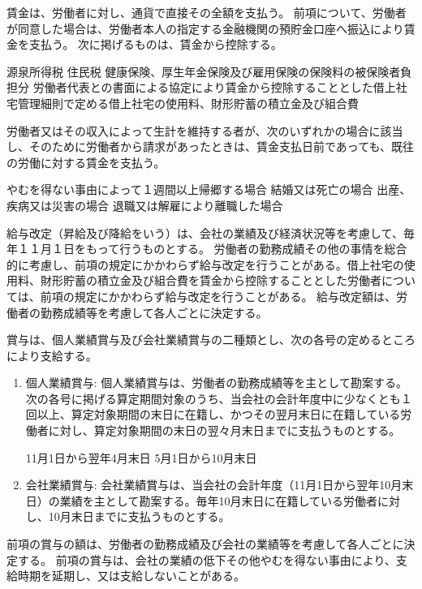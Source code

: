 \documentclass[10pt,a4paper,uplatex]{jsarticle}
\begin{document}
賃金は、労働者に対し、通貨で直接その全額を支払う。
\term
前項について、労働者が同意した場合は、労働者本人の指定する金融機関の預貯金口座へ振込により賃金を支払う。
\term
次に掲げるものは、賃金から控除する。
\begin{enumerate}
    \itm 源泉所得税
    \itm 住民税
    \itm 健康保険、厚生年金保険及び雇用保険の保険料の被保険者負担分
    \itm 労働者代表との書面による協定により賃金から控除することとした借上社宅管理細則で定める借上社宅の使用料、財形貯蓄の積立金及び組合費
\end{enumerate}

労働者又はその収入によって生計を維持する者が、次のいずれかの場合に該当し、そのために労働者から請求があったときは、賃金支払日前であっても、既往の労働に対する賃金を支払う。
\begin{enumerate}
    \itm やむを得ない事由によって１週間以上帰郷する場合
    \itm 結婚又は死亡の場合
    \itm 出産、疾病又は災害の場合
    \itm 退職又は解雇により離職した場合
\end{enumerate}

給与改定（昇給及び降給をいう）は、会社の業績及び経済状況等を考慮して、毎年１１月１日をもって行うものとする。
\term
労働者の勤務成績その他の事情を総合的に考慮し、前項の規定にかかわらず給与改定を行うことがある。借上社宅の使用料、財形貯蓄の積立金及び組合費を賃金から控除することとした労働者については、前項の規定にかかわらず給与改定を行うことがある。
\term
給与改定額は、労働者の勤務成績等を考慮して各人ごとに決定する。

賞与は、個人業績賞与及び会社業績賞与の二種類とし、次の各号の定めるところにより支給する。
\begin{enumerate}
    \item 個人業績賞与: 個人業績賞与は、労働者の勤務成績等を主として勘案する。次の各号に掲げる算定期間対象のうち、当会社の会計年度中に少なくとも１回以上、算定対象期間の末日に在籍し、かつその翌月末日に在籍している労働者に対し、算定対象期間の末日の翌々月末日までに支払うものとする。
        \begin{enumerate}
            \itm 11月1日から翌年4月末日
            \itm 5月1日から10月末日
        \end{enumerate}
    \item 会社業績賞与: 会社業績賞与は、当会社の会計年度（11月1日から翌年10月末日）の業績を主として勘案する。毎年10月末日に在籍している労働者に対し、10月末日までに支払うものとする。
\end{enumerate}
\term 前項の賞与の額は、労働者の勤務成績及び会社の業績等を考慮して各人ごとに決定する。
\term 前項の賞与は、会社の業績の低下その他やむを得ない事由により、支給時期を延期し、又は支給しないことがある。
\end{document}
